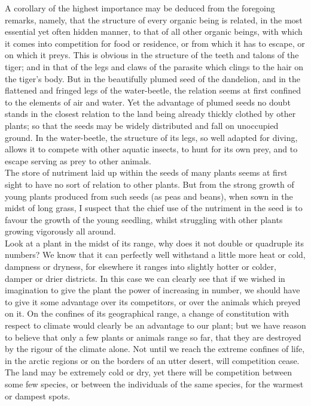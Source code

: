 \indent A corollary of the highest importance may be deduced from the foregoing remarks, namely, that the structure of every organic being is related, in the most essential yet often hidden manner, to that of all other organic beings, with which it comes into competition for food or residence, or from which it has to escape, or on which it preys. This is obvious in the structure of the teeth and talons of the tiger; and in that of the legs and claws of the parasite which clings to the hair on the tiger's body. But in the beautifully plumed seed of the dandelion, and in the flattened and fringed legs of the water-beetle, the relation seems at first confined to the elements of air and water. Yet the advantage of plumed seeds no doubt stands in the closest relation to the land being already thickly clothed by other plants; so that the seeds may be widely distributed and fall on unoccupied ground. In the water-beetle, the structure of its legs, so well adapted for diving, allows it to compete with other aquatic insects, to hunt for its own prey, and to escape serving as prey to other animals.\\
\indent The store of nutriment laid up within the seeds of many plants seems at first sight to have no sort of relation to other plants. But from the strong growth of young plants produced from such seeds (as peas and beans), when sown in the midst of long grass, I suspect that the chief use of the nutriment in the seed is to favour the growth of the young seedling, whilst struggling with other plants growing vigorously all around.\\
\indent Look at a plant in the midst of its range, why does it not double or quadruple its numbers? We know that it can perfectly well withstand a little more heat or cold, dampness or dryness, for elsewhere it ranges into slightly hotter or colder, damper or drier districts. In this case we can clearly see that if we wished in imagination to give the plant the power of increasing in number, we should have to give it some advantage over its competitors, or over the animals which preyed on it. On the confines of its geographical range, a change of constitution with respect to climate would clearly be an advantage to our plant; but we have reason to believe that only a few plants or animals range so far, that they are destroyed by the rigour of the climate alone. Not until we reach the extreme confines of life, in the arctic regions or on the borders of an utter desert, will competition cease. The land may be extremely cold or dry, yet there will be competition between some few species, or between the individuals of the same species, for the warmest or dampest spots.\\

